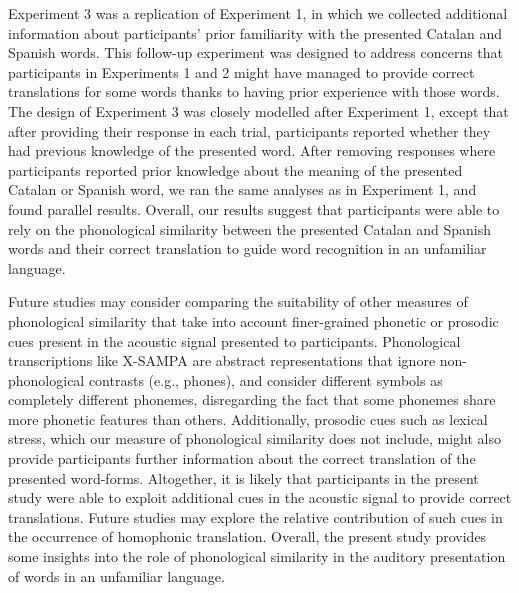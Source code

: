 \documentclass[
]{article}
\begin{document}
Experiment 3 was a replication of Experiment 1, in which we collected
additional information about participants' prior familiarity with the
presented Catalan and Spanish words. This follow-up experiment was
designed to address concerns that participants in Experiments 1 and 2
might have managed to provide correct translations for some words thanks
to having prior experience with those words. The design of Experiment 3
was closely modelled after Experiment 1, except that after providing
their response in each trial, participants reported whether they had
previous knowledge of the presented word. After removing responses where
participants reported prior knowledge about the meaning of the presented
Catalan or Spanish word, we ran the same analyses as in Experiment 1,
and found parallel results. Overall, our results suggest that
participants were able to rely on the phonological similarity between
the presented Catalan and Spanish words and their correct translation to
guide word recognition in an unfamiliar language.

Future studies may consider comparing the suitability of other measures
of phonological similarity that take into account finer-grained phonetic
or prosodic cues present in the acoustic signal presented to
participants. Phonological transcriptions like X-SAMPA are abstract
representations that ignore non-phonological contrasts (e.g., phones),
and consider different symbols as completely different phonemes,
disregarding the fact that some phonemes share more phonetic features
than others. Additionally, prosodic cues such as lexical stress, which
our measure of phonological similarity does not include, might also
provide participants further information about the correct translation
of the presented word-forms. Altogether, it is likely that participants
in the present study were able to exploit additional cues in the
acoustic signal to provide correct translations. Future studies may
explore the relative contribution of such cues in the occurrence of
homophonic translation. Overall, the present study provides some
insights into the role of phonological similarity in the auditory
presentation of words in an unfamiliar language.
\end{document}
